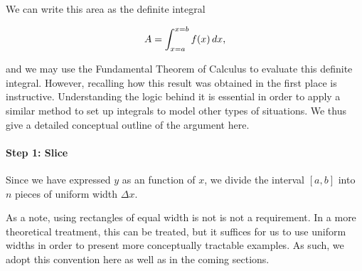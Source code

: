 \documentclass{ximera}
\begin{document}
We can write this area as the definite integral 

\[A = \int_{x=a}^{x=b} f(x) \mathop{}\!d x , \]

and we may use the Fundamental Theorem of Calculus to evaluate this definite integral.  However, recalling how this result was obtained in the first place is instructive.  Understanding the logic behind it is essential in order to apply a similar method to set up integrals to model other types of situations.  We thus give a detailed conceptual outline of the argument here.

\paragraph{Step 1: Slice}

Since we have expressed $y$ as an function of $x$, we divide the interval $[a,b]$ into $n$ pieces of uniform width $\Delta x$. 

\begin{image}
\end{image}


As a note, using rectangles of equal width is not is not a requirement.  In a more theoretical treatment, this can be treated, but it suffices for us to use uniform widths in order to present more conceptually tractable examples.  As such, we adopt this convention here as well as in the coming sections. 
\end{document}
